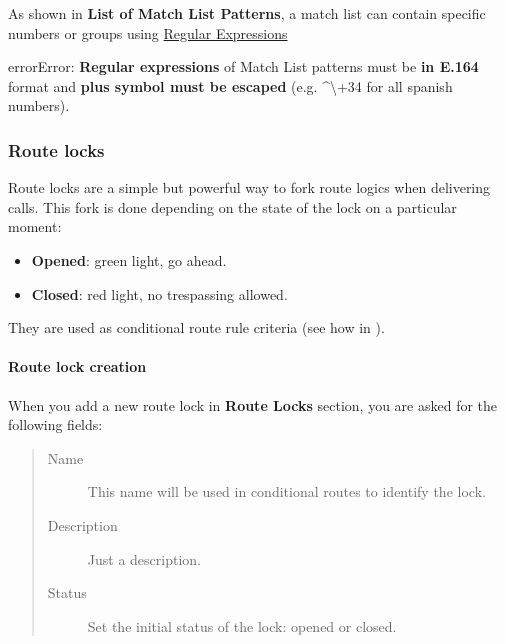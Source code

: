 \documentclass[letterpaper,10pt,spanish]{sphinxmanual}
\begin{document}
As shown in \textbf{List of Match List Patterns}, a match list can contain specific numbers or groups using
\href{http://php.net/manual/en/reference.pcre.pattern.syntax.php}{Regular Expressions}

\begin{notice}{error}{Error:}
\textbf{Regular expressions} of Match List patterns must be \textbf{in E.164} format and \textbf{plus symbol must be
escaped} (e.g. \textasciicircum{}\textbackslash{}+34 for all spanish numbers).
\end{notice}
\label{administration_portal/client/vpbx/routing_tools/route_locks:route-locks}

\subsubsection{Route locks}
\label{administration_portal/client/vpbx/routing_tools/route_locks:id2}\label{administration_portal/client/vpbx/routing_tools/route_locks:route-locks}\label{administration_portal/client/vpbx/routing_tools/route_locks::doc}\label{administration_portal/client/vpbx/routing_tools/route_locks:id1}
Route locks are a simple but powerful way to fork route logics when delivering calls. This fork is done depending on the
state of the lock on a particular moment:
\begin{itemize}
\item {} 
\textbf{Opened}: green light, go ahead.

\item {} 
\textbf{Closed}: red light, no trespassing allowed.

\end{itemize}

They are used as conditional route rule criteria (see how in {\hyperref[administration_portal/client/vpbx/routing_endpoints/conditional_routes:conditional\string-routes]{}}).


\paragraph{Route lock creation}
\label{administration_portal/client/vpbx/routing_tools/route_locks:route-lock-creation}
When you add a new route lock in \textbf{Route Locks} section, you are asked for the following fields:
\begin{quote}
\begin{description}
\item[{Name}] \leavevmode
This name will be used in conditional routes to identify the lock.

\item[{Description}] \leavevmode
Just a description.

\item[{Status}] \leavevmode
Set the initial status of the lock: opened or closed.

\end{description}
\end{quote}
\end{document}
